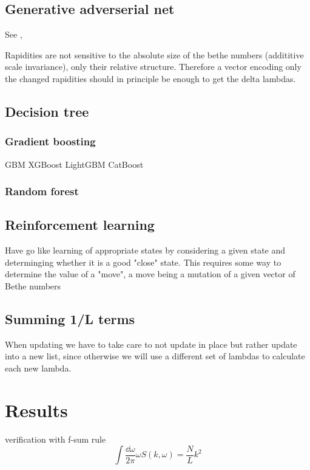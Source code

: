 \documentclass[11pt, a4paper,draft]{report} %
\begin{document}
\section{Generative adverserial net}
See \cite{Liu2017}, \cite{Kratzwald2017}

Rapidities are not sensitive to the absolute size of the bethe numbers (addititive scale invariance), only their relative structure.
Therefore a vector encoding only the changed rapidities should in principle be enough to get the delta lambdas.

\section{Decision tree}

\subsection{Gradient boosting}

GBM
XGBoost
LightGBM
CatBoost

\subsection{Random forest}

\section{Reinforcement learning}
Have go like learning of appropriate states by considering a given state and determinging whether it is a good "close" state.
This requires some way to determine the value of a "move", a move being a mutation of a given vector of Bethe numbers\cite{Silver2017}

\section{Summing 1/L terms}

When updating we have to take care to not update in place but rather update into a new list, since otherwise we will use a different set of lambdas to calculate each new lambda.



\newpage


\chapter{Results}

verification with f-sum rule \cite{Caux2007a}
\begin{equation}
    \int \frac{\dd \omega}{2\pi} \omega S(k, \omega) = \frac{N}{L} k^2
\end{equation}
\end{document}
